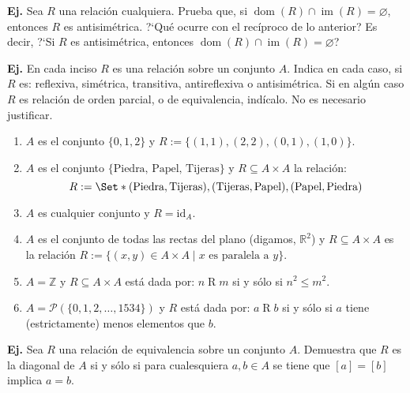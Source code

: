 \documentclass[letterpaper,DIV=14,headsepline,12pt]{scrartcl}
\providecommand\st{\;|\;}
\newcounter{Ejer}
\newcommand{\pts}{}
\newenvironment{ejercicio}[1]{\noindent
    \ifthenelse{\equal{#1}{1}}{\renewcommand{\pts}{\textbf{(#1 pt)}}}{\renewcommand{\pts}{\textbf{(#1 pts)}}}\textbf{Ej. \theEjer} \pts\stepcounter{Ejer}}{\vspace{.3cm}}
\newcommand{\id}{\mathrm{id}}
\renewcommand{\emptyset}{\varnothing}
\DeclareMathOperator{\ima}{im}
\DeclareMathOperator{\dom}{dom}
\begin{document}
    \begin{ejercicio}{1}
        Sea $R$ una relación cualquiera. Prueba que, si $\dom(R) \cap \ima(R) =
        \emptyset$, entonces $R$ es antisimétrica. ?`Qué ocurre con el recíproco
        de lo anterior? Es decir, ?`Si $R$ es antisimétrica, entonces $\dom(R)
        \cap \ima(R) = \emptyset$?
    \end{ejercicio}

    \begin{ejercicio}{1}
        En cada inciso $R$ es una relación sobre un conjunto $A$. Indica en cada caso, si $R$ es: reflexiva, simétrica, transitiva, antireflexiva o antisimétrica. Si en algún caso $R$ es relación de orden parcial, o de equivalencia, indícalo. No es necesario justificar.
        \begin{enumerate}
            \item $A$ es el conjunto $\{0,1,2\}$ y $R:=\{(1,1),(2,2),(0,1),(1,0)\}$.

            \item $A$ es el conjunto $\{\text{Piedra, Papel, Tijeras}\}$ y $R \subseteq A \times A$ la relación:
            \[ R := \Set*{(\text{Piedra}, \text{Tijeras}), (\text{Tijeras}, \text{Papel}), (\text{Papel}, \text{Piedra})} \]
 
            \item $A$ es cualquier conjunto y $R=\id_A$.

            \item $A$ es el conjunto de todas las rectas del plano (digamos, $\mathbb{R}^2$) y $R \subseteq A \times A$ es la relación $R:=\{(x,y) \in A \times A \st x \text{ es paralela a } y\}$.
            
            \item $A=\mathbb{Z}$ y $R \subseteq A \times A$ está dada por: $n \mathrel{R} m$ si y sólo si $n ^2 \leq m^2$.

            \item $A=\mathscr{P}(\{0,1,2,\dotsc,1534\})$ y $R$ está dada por: $a \mathrel{R} b$ si y sólo si $a$ tiene (estrictamente) menos elementos que $b$.
        \end{enumerate}
    \end{ejercicio}

    \begin{ejercicio}{1}
        Sea $R$ una relación de equivalencia sobre un conjunto $A$. Demuestra que $R$ es la diagonal de $A$ si y sólo si para cualesquiera $a,b \in A$ se tiene que $[a]=[b]$ implica $a=b$.
    \end{ejercicio}
\end{document}
